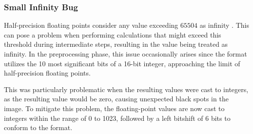 \subsubsection{Small Infinity Bug}
Half-precision floating points consider any value exceeding $65504$ as infinity \cite{HalfprecisionFloatingpointFormat2023}.
This can pose a problem when performing calculations that might exceed this threshold during intermediate steps, resulting in the value being treated as infinity.
In the preprocessing phase, this issue occasionally arises since the  format utilizes the 10 most significant bits of a 16-bit integer, approaching the limit of half-precision floating points.

This was particularly problematic when the resulting values were cast to integers, as the resulting value would be zero, causing unexpected black spots in the image.
To mitigate this problem, the floating-point values are now cast to integers within the range of 0 to 1023, followed by a left bitshift of 6 bits to conform to the  format.


